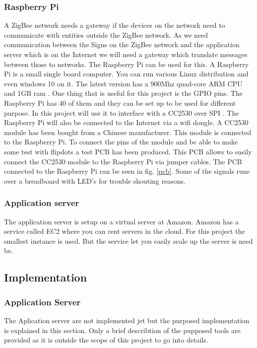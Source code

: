 \documentclass[a4paper,12pt,english]{article}
\begin{document}
\subsubsection{Raspberry Pi}
A ZigBee network needs a gateway if the devices on the network need to
communicate with entities outside the ZigBee network. As we need
communication between the Signs on the ZigBee network and the application
server which is on the Internet we will need a gateway which translate
messages between those to networks. The Raspberry Pi can be used for this. A
Raspberry Pi is a small single board computer. You can run various Linux
distribution and even windows 10 on it. The latest version has a 900Mhz
quad-core ARM CPU and 1GB ram \cite{raspberry}. One thing that is useful
for this project is the GPIO pins. The Raspberry Pi has 40 of them and they can be set up to
be used for different purpose. In this project will use it to interface with a
CC2530 over SPI . The Raspberry
Pi will also be connected to the Internet via a wifi dongle. A CC2530 module
has been bought from a Chinese manufacturer. This module is connected to the
Raspberry Pi. To connect the pins of the module and be able to make some
test with flipdots a test PCB has been produced. This PCB allows to easily
connect the CC2530 module to the Raspberry Pi via jumper cables. The PCB
connected to the Raspberry Pi can be seen in fig. \ref{pcb}. Some of the signals
runs over a breadboard with LED's for trouble shouting reasons.

\subsubsection{Application server}
The application server is setup on a virtual server at Amazon. Amazon has a
service called EC2 where you can rent servers in the cloud. For this project the
smallest instance is used. But the service let you easily scale up the server
is need be.

\subsection{Implementation}


\subsubsection{Application Server}
The Aplication server are not implemented jet but the purposed implementation is
explained in this section. Only a brief describtion of the pupposed tools are
provided as it is outside the scope of this project to go into details.
\end{document}
